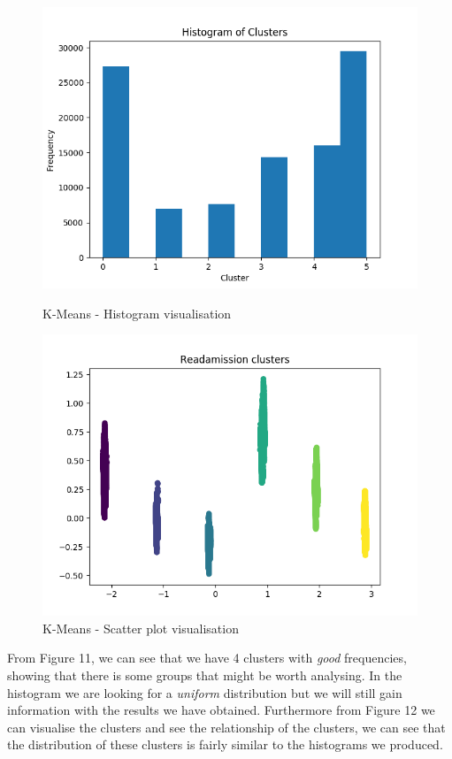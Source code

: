\documentclass[11pt]{report}
\begin{document}
\begin{figure}[ht]
	\begin{minipage}[b]{.5\textwidth}
	\centering
	\includegraphics[width=1\textwidth]{clust_hist.png}
	\caption{K-Means - Histogram visualisation}
	\end{minipage}
	\hfill
	\begin{minipage}[b]{.5\textwidth}
	\centering
	\includegraphics[width=1\textwidth]{clust_scatter.png}
\caption{K-Means - Scatter plot visualisation}
\end{minipage}
\end{figure}
\noindent
From Figure 11, we can see that we have 4 clusters with \textit{good} frequencies, showing that there is some groups that might be worth analysing. In the histogram we are looking for a \textit{uniform} distribution but we will still gain information with the results we have obtained. Furthermore from Figure 12 we can visualise the clusters and see the relationship of the clusters, we can see that the distribution of these clusters is fairly similar to the histograms we produced.
\end{document}
